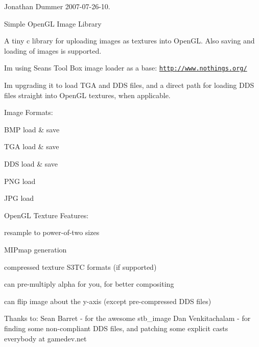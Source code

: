 Jonathan Dummer 2007-\/07-\/26-\/10.

Simple Open\+GL Image Library

A tiny c library for uploading images as textures into Open\+GL. Also saving and loading of images is supported.

I\textquotesingle{}m using Sean\textquotesingle{}s Tool Box image loader as a base\+: \href{http://www.nothings.org/}{\tt http\+://www.\+nothings.\+org/}

I\textquotesingle{}m upgrading it to load T\+GA and D\+DS files, and a direct path for loading D\+DS files straight into Open\+GL textures, when applicable.

Image Formats\+:
\begin{DoxyItemize}
\item B\+MP load \& save
\item T\+GA load \& save
\item D\+DS load \& save
\item P\+NG load
\item J\+PG load
\end{DoxyItemize}

Open\+GL Texture Features\+:
\begin{DoxyItemize}
\item resample to power-\/of-\/two sizes
\item M\+I\+Pmap generation
\item compressed texture S3\+TC formats (if supported)
\item can pre-\/multiply alpha for you, for better compositing
\item can flip image about the y-\/axis (except pre-\/compressed D\+DS files)
\end{DoxyItemize}

Thanks to\+: Sean Barret -\/ for the awesome stb\+\_\+image Dan Venkitachalam -\/ for finding some non-\/compliant D\+DS files, and patching some explicit casts everybody at gamedev.\+net 